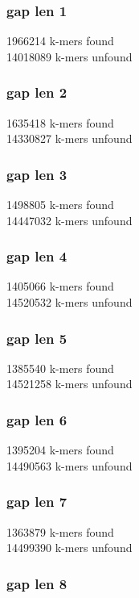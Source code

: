 \documentclass[12pt]{article}
\begin{document}
\subsubsection{gap len 1}

1966214 k-mers found \\
14018089 k-mers unfound

\subsubsection{gap len 2}

1635418 k-mers found \\
14330827 k-mers unfound

\subsubsection{gap len 3}

1498805 k-mers found \\
14447032 k-mers unfound

\subsubsection{gap len 4}

1405066 k-mers found \\
14520532 k-mers unfound

\subsubsection{gap len 5}

1385540 k-mers found \\
14521258 k-mers unfound

\subsubsection{gap len 6}

1395204 k-mers found \\
14490563 k-mers unfound

\subsubsection{gap len 7}

1363879 k-mers found \\
14499390 k-mers unfound

\subsubsection{gap len 8}
\end{document}
